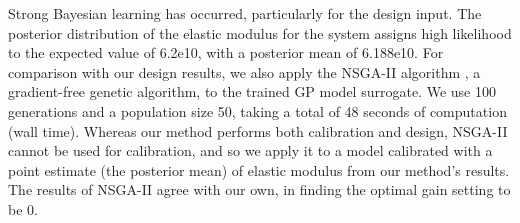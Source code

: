 \documentclass[10pt]{asme2ej}
\begin{document}
%
Strong Bayesian learning has occurred, particularly for the design input.
%
The posterior distribution of the elastic modulus for the system assigns high likelihood to the expected value of 6.2e10, with a posterior mean of 6.188e10.
%
For comparison with our design results, we also apply the NSGA-II algorithm \cite{Deb2002}, a gradient-free genetic algorithm, to the trained GP model surrogate.
%
We use 100 generations and a population size 50, taking a total of 48 seconds of computation (wall time).
%
Whereas our method performs both calibration and design, NSGA-II cannot be used for calibration, and so we apply it to a model calibrated with a point estimate (the posterior mean) of elastic modulus from our method's results.
%
The results of NSGA-II agree with our own, in finding the optimal gain setting to be 0.
%
\end{document}

